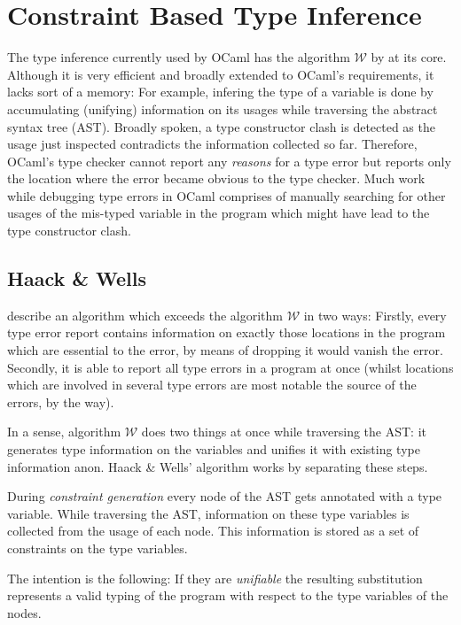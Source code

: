 
\section{Constraint Based Type Inference}
\label{sec:typeinfer}

The type inference currently used by OCaml has the algorithm $\mathcal W$ by
\citet{milner78} at its core.
Although it is very efficient and broadly extended to OCaml's 
requirements, it lacks sort of a memory:  For example, infering the type of a
variable is done by accumulating (unifying) information on its usages while
traversing the abstract syntax tree (AST).
Broadly spoken, a type constructor clash is detected as the usage just
inspected contradicts the information collected so far.
Therefore, OCaml's type checker cannot report any \emph{reasons} for a type
error but reports only the location where the error became obvious to the type
checker.
Much work while debugging type errors in OCaml comprises of manually searching
for other usages of the mis-typed variable in the program which might have lead
to the type constructor clash.


\subsection{Haack \& Wells}

\citet{haackwells04} describe an algorithm which exceeds the algorithm
$\mathcal W$ in two ways:
Firstly, every type error report contains information on exactly those
locations in the program which are essential to the error, by means of dropping
it would vanish the error.
Secondly, it is able to report all type errors in a program at once (whilst
locations which are involved in several type errors are most notable the source
of the errors, by the way).

In a sense, algorithm $\mathcal W$ does two things at once while traversing the 
AST: it generates type information on the variables and unifies it with 
existing type information anon.  Haack \& Wells' algorithm works by separating
these steps.

During \emph{constraint generation} every node of the AST gets 
annotated with a type variable. While traversing the AST, information on 
these type variables is collected from the usage of each node.  This
information is stored as a set of constraints on the type variables.

The intention is the following: If they are \emph{unifiable} the resulting
substitution represents a valid typing of the program with respect to the type
variables of the nodes.

